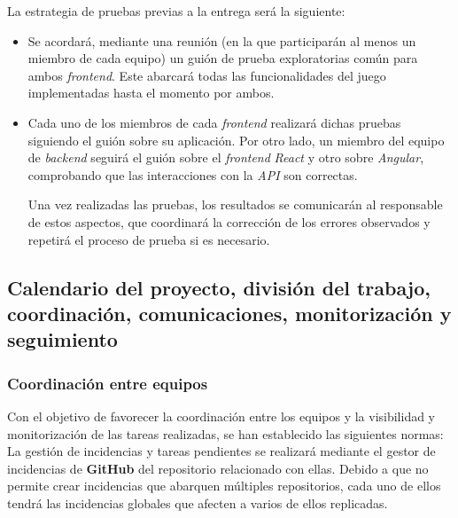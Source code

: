 \documentclass[11pt, a4paper, titlepage]{article}
\begin{document}
\begin{itemize}
    La estrategia de pruebas previas a la entrega será la siguiente:
    \begin{itemize}
        \item Se acordará, mediante una reunión (en la que participarán al menos un miembro de cada equipo) un guión de prueba exploratorias común para ambos \textit{frontend}. Este abarcará todas las funcionalidades del juego implementadas hasta el momento por ambos.

        \item Cada uno de los miembros de cada \textit{frontend} realizará dichas pruebas siguiendo el guión sobre su aplicación. Por otro lado, un miembro del equipo de \textit{backend} seguirá el guión sobre el \textit{frontend} \textit{React} y otro sobre \textit{Angular}, comprobando que las interacciones con la \textit{API} son correctas.

        Una vez realizadas las pruebas, los resultados se comunicarán al responsable de estos aspectos, que coordinará la corrección de los errores observados y repetirá el proceso de prueba si es necesario.
    \end{itemize}
\end{itemize}


\subsection{Calendario del proyecto, división del trabajo, coordinación, comunicaciones, monitorización y seguimiento}


\subsubsection{Coordinación entre equipos}
Con el objetivo de favorecer la coordinación entre los equipos y la visibilidad y monitorización de las tareas realizadas, se han establecido las siguientes normas:\\

La gestión de incidencias y tareas pendientes se realizará mediante el gestor de incidencias de \textbf{GitHub} del repositorio relacionado con ellas. Debido a que no permite crear incidencias que abarquen múltiples repositorios, cada uno de ellos tendrá las incidencias globales que afecten a varios de ellos replicadas. \\
\end{document}
